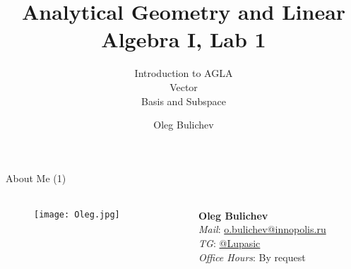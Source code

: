 \documentclass[aspectratio=169,notes]{beamer}
\title[AGLA1]{Analytical Geometry and Linear Algebra I, Lab 1} %
\subtitle{Introduction to AGLA \\ Vector  \\ Basis and Subspace  
         } %
\author{Oleg Bulichev}
\newcommand{\fbckg}[1]{\usebackgroundtemplate{\texttt{[image: \#1]}}}%
\begin{document}
\setlength{\abovedisplayskip}{0pt}
\setlength{\belowdisplayskip}{0pt}
\setlength{\abovedisplayshortskip}{0pt}
\setlength{\belowdisplayshortskip}{0pt}

\fbckg{fibeamer/figs/title_page.png}

\fbckg{fibeamer/figs/common.png}

\begin{frame}[t]{About Me (1)}
    \framesubtitle{}
    \begin{columns}[T,onlytextwidth]
        \begin{column}{0.49\textwidth}
            \begin{figure}[H]
                \centering\texttt{[image: Oleg.jpg]}
                \label{fig:Oleg.jpg}
            \end{figure}
        \end{column}
        \begin{column}{0.49\textwidth}
            \Large
            \vspace{2cm}
            \centering
            \textbf{Oleg Bulichev} \\
            \textit{Mail}: \url{o.bulichev@innopolis.ru}\\
            \textit{TG}: \url{@Lupasic} \\
            \textit{Office Hours}: By request
        \end{column}
    \end{columns}
\end{frame}
\end{document}
